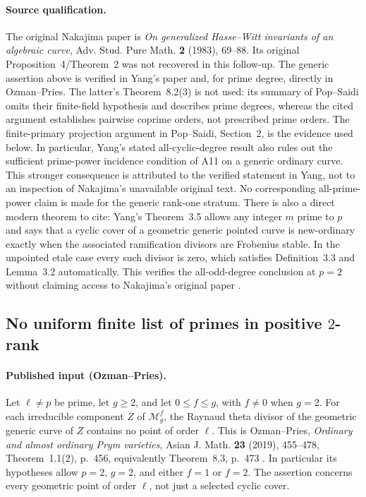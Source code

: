 \documentclass[11pt,a4paper]{article}
\begin{document}
\paragraph{Source qualification.}
The original Nakajima paper is \emph{On generalized Hasse--Witt
invariants of an algebraic curve}, Adv. Stud. Pure Math.
\textbf{2} (1983), 69--88. Its original Proposition~4/Theorem~2 was
not recovered in this follow-up. The generic assertion above is
verified in Yang's paper and, for prime degree, directly in
Ozman--Pries. The latter's Theorem~8.2(3) is not used: its summary of
Pop--Saidi omits their finite-field hypothesis and describes prime
degrees, whereas the cited argument establishes pairwise coprime
orders, not prescribed prime orders. The finite-primary projection
argument in Pop--Saidi, Section~2, is the evidence used below.
\cite[Propositions~2.1,2.3 and their proofs, pp.~112--114]{PopSaidi}
In particular, Yang's stated all-cyclic-degree result also rules
out the sufficient prime-power incidence condition of A11 on a
generic ordinary curve. This stronger consequence is attributed to
the verified statement in Yang, not to an inspection of Nakajima's
unavailable original text. No corresponding all-prime-power claim
is made for the generic rank-one stratum.
There is also a direct modern theorem to cite: Yang's
Theorem~3.5 allows any integer $m$ prime to $p$ and says that a
cyclic cover of a geometric generic pointed curve is new-ordinary
exactly when the associated ramification divisors are Frobenius
stable. In the unpointed etale case every such divisor is zero,
which satisfies Definition~3.3 and Lemma~3.2 automatically.
This verifies the all-odd-degree conclusion at $p=2$ without
claiming access to Nakajima's original paper
\cite[Definition~3.3, Theorem~3.5]{Yang2021}.



\subsection{No uniform finite list of primes in positive $2$-rank}
\label{sec:finite-prime-avoidance}

\paragraph{Published input (Ozman--Pries).}
Let $\ell\ne p$ be prime, let $g\ge2$, and let $0\le f\le g$, with
$f\ne0$ when $g=2$.  For each irreducible component $Z$ of
$\mathcal M_g^f$, the Raynaud theta divisor of the geometric generic
curve of $Z$ contains no point of order $\ell$.  This is
Ozman--Pries, \emph{Ordinary and almost ordinary Prym varieties},
Asian J. Math. \textbf{23} (2019), 455--478,
Theorem~1.1(2), p.~456, equivalently Theorem~8.3, p.~473 \cite{OzmanPries2019}.
In particular its hypotheses allow $p=2$, $g=2$, and either $f=1$ or
$f=2$.  The assertion concerns every geometric point of order $\ell$,
not just a selected cyclic cover.
\end{document}
